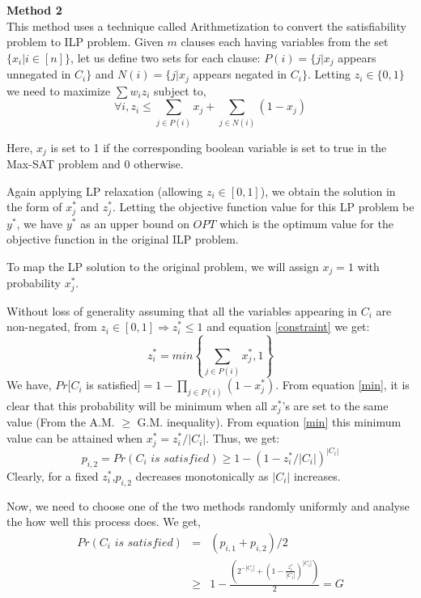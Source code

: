 \noindent
{\bf Method 2}\\
This method uses a technique called Arithmetization to convert the satisfiability problem to ILP problem. Given $m$ clauses each having variables from the set $\{x_i|i\in [n]\}$, let us define two sets for each clause: $P(i) = \{j|x_j$ appears unnegated in $C_i\}$ and $N(i) = \{j|x_j$ appears negated in $C_i\}$. Letting $z_i \in \{0,1\}$ we need to maximize $\sum w_iz_i$ subject to,
\begin{equation}
\forall i, z_i \leq \sum\limits_{j\in P(i)} x_j + \sum\limits_{j\in N(i)} (1-x_j)
\label{constraint}
\end{equation}

Here, $x_j$ is set to 1 if the corresponding boolean variable is set to true in the Max-SAT problem and 0 otherwise.

Again applying LP relaxation (allowing $z_i \in [0,1]$), we obtain the solution in the form of $x_j^*$ and $z_j^*$. Letting the objective function value for this LP problem be $y^*$, we have $y^*$ as an upper bound on $OPT$ which is the optimum value for the objective function in the original ILP problem.

To map the LP solution to the original problem, we will assign $x_j=1$ with probability $x_j^*$.

Without loss of generality assuming that all the variables appearing in $C_i$ are non-negated, from $z_i \in [0,1] \Rightarrow z_i^* \leq 1 $ and equation \ref{constraint} we get:
\begin{equation}
z_i^* = min \left\{ \sum\limits_{j \in P(i)}x_j^*,1 \right\}
\label{min}
\end{equation}
We have, $Pr[C_i$ is satisfied$] = 1 - \prod_{j\in P(i)}(1-x_j^*)$. From equation \ref{min}, it is clear that this probability will be minimum when all $x_j^*$'s are set to the same value (From the A.M. $\geq$ G.M. inequality). From equation \ref{min} this minimum value can be attained when $x_j^* = z_i^*/|C_i|$. Thus, we get:
\begin{equation}
p_{i,2} = Pr(C_i\,\, is\,\, satisfied) \geq 1 - (1-z_i^*/|C_i|)^{|C_i|}
\label{pi2}
\end{equation}
Clearly, for a fixed $z_i^*$,$ p_{i,2}$ decreases monotonically as $|C_i|$ increases. 

Now, we need to choose one of the two methods randomly uniformly and analyse the how well this process does. We get,
\[
\begin{array}{rcl}
Pr(C_i\,\, is\,\, satisfied) & = & (p_{i,1} + p_{i,2})/2\\
	& \geq & 1 - \frac {\left( 2^{-|C_i|} + \left( 1 - \frac{z_i^*}{|C_i|} \right)^{|C_i|}\right)}{2} = G \\
\end{array}
\]

